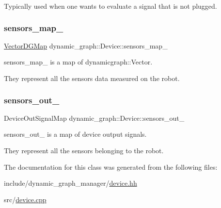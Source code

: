 Typically used when one wants to evaluate a signal that is not plugged. \mbox{\label{classdynamic__graph_1_1Device_a338b04580b75994516b8cc04d6605541}} 
\subsubsection{\texorpdfstring{sensors\+\_\+map\+\_\+}{sensors\_map\_}}
{\footnotesize\ttfamily \hyperlink{namespacedynamic__graph_abd184187f3bc15df5e227d866529e4a7}{Vector\+D\+G\+Map} dynamic\+\_\+graph\+::\+Device\+::sensors\+\_\+map\+\_\+}



sensors\+\_\+map\+\_\+ is a map of dynamicgraph\+::\+Vector. 

They represent all the sensors data measured on the robot. \mbox{\label{classdynamic__graph_1_1Device_ab397e65116cdc32ffa767bfc92c0b7e0}} 
\subsubsection{\texorpdfstring{sensors\+\_\+out\+\_\+}{sensors\_out\_}}
{\footnotesize\ttfamily Device\+Out\+Signal\+Map dynamic\+\_\+graph\+::\+Device\+::sensors\+\_\+out\+\_\+}



sensors\+\_\+out\+\_\+ is a map of device output signals. 

They represent all the sensors belonging to the robot. 

The documentation for this class was generated from the following files\+:\begin{DoxyCompactItemize}
\item 
include/dynamic\+\_\+graph\+\_\+manager/\hyperlink{device_8hh}{device.\+hh}\item 
src/\hyperlink{device_8cpp}{device.\+cpp}\end{DoxyCompactItemize}
